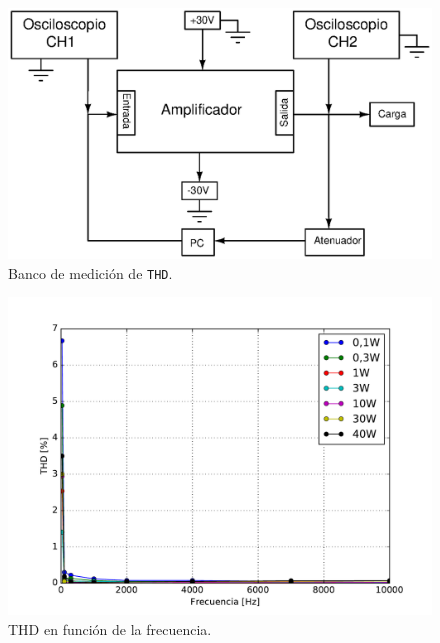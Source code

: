 		\begin{figure}[h!]
			\centering
			\includegraphics[scale=0.6]{./Figuras/banco_thd.eps}
			\caption{Banco de medición de \texttt{THD}.}
			\label{fig:thd_bco}
		\end{figure}

		\begin{figure}[H]
			\centering
			\includegraphics[scale=0.6]{./Figuras/thd.pdf}
			\caption{THD en función de la frecuencia.}
			\label{fig:thd}
		\end{figure}

